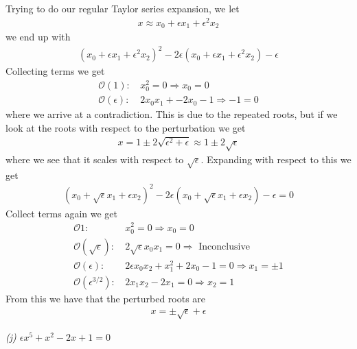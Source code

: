\documentclass[12pt]{article}
\theoremstyle{remark}
\begin{document}
Trying to do our regular Taylor series expansion, we let 
\begin{align*}
x \approx x_0 + \epsilon x_1 + \epsilon^2x_2
\end{align*}
we end up with 
\begin{align*}
(x_0 + \epsilon x_1 + \epsilon^2x_2)^2 -2\epsilon(x_0 + \epsilon x_1 + \epsilon^2x_2) - \epsilon
\end{align*}
Collecting terms we get
\begin{align*}
\mathcal{O}(1): & \, x_0^2 = 0 \Rightarrow x_0 = 0 \\
\mathcal{O}(\epsilon): & \, 2x_0x_1 + -2x_0 - 1 \Rightarrow -1 = 0
\end{align*}
where we arrive at a contradiction. This is due to the repeated roots, but if we look at the roots with respect to the perturbation we get
\begin{align*}
x = 1 \pm 2\sqrt{\epsilon^2 + \epsilon} \approx 1 \pm 2\sqrt{\epsilon}
\end{align*}
where we see that it scales with respect to $\sqrt{\epsilon}$. Expanding with respect to this we get
\begin{align*}
(x_0 + \sqrt{\epsilon}x_1 + \epsilon x_2)^2 - 2\epsilon(x_0 + \sqrt{\epsilon}x_1 + \epsilon x_2) - \epsilon = 0
\end{align*}
Collect terms again we get
\begin{align*}
\mathcal{O}{1}: & \, x_0^2 = 0 \Rightarrow x_0 = 0 \\
\mathcal{O}(\sqrt{\epsilon}): & \, 2\sqrt{\epsilon}x_0x_1 = 0 \Rightarrow \text{ Inconclusive} \\ 
\mathcal{O}(\epsilon): & \, 2\epsilon x_0x_2 + x_1^2 + 2x_0 - 1 =0 \Rightarrow x_1 = \pm 1 \\
\mathcal{O}(\epsilon^{3/2}): & \, 2x_1x_2 - 2x_1 = 0 \Rightarrow x_2 = 1
\end{align*}
From this we have that the perturbed roots are 
\begin{align*}
x = \pm\sqrt{\epsilon} + \epsilon
\end{align*}

\newpage

\textit{(j) $\epsilon x^5 + x^2 - 2x + 1 = 0$} \\
\end{document}
